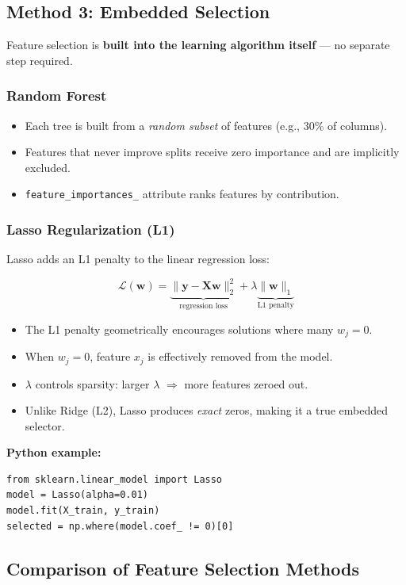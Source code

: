 \documentclass[11pt]{article}
\begin{document}
\subsection{Method 3: Embedded Selection}
Feature selection is \textbf{built into the learning algorithm itself} --- no separate step required.

\subsubsection{Random Forest}
\begin{itemize}
    \item Each tree is built from a \emph{random subset} of features (e.g., 30\% of columns).
    \item Features that never improve splits receive zero importance and are implicitly excluded.
    \item \texttt{feature\_importances\_} attribute ranks features by contribution.
\end{itemize}

\subsubsection{Lasso Regularization (L1)}
Lasso adds an L1 penalty to the linear regression loss:

\[
\mathcal{L}(\mathbf{w}) = \underbrace{\|\mathbf{y} - \mathbf{X}\mathbf{w}\|_2^2}_{\text{regression loss}}
    + \lambda \underbrace{\|\mathbf{w}\|_1}_{\text{L1 penalty}}
\]

\begin{itemize}
    \item The L1 penalty geometrically encourages solutions where many $w_j = 0$.
    \item When $w_j = 0$, feature $x_j$ is effectively removed from the model.
    \item $\lambda$ controls sparsity: larger $\lambda$ $\Rightarrow$ more features zeroed out.
    \item Unlike Ridge (L2), Lasso produces \emph{exact} zeros, making it a true embedded selector.
\end{itemize}

\textbf{Python example:}
\begin{verbatim}
from sklearn.linear_model import Lasso
model = Lasso(alpha=0.01)
model.fit(X_train, y_train)
selected = np.where(model.coef_ != 0)[0]
\end{verbatim}

\subsection{Comparison of Feature Selection Methods}
\end{document}
